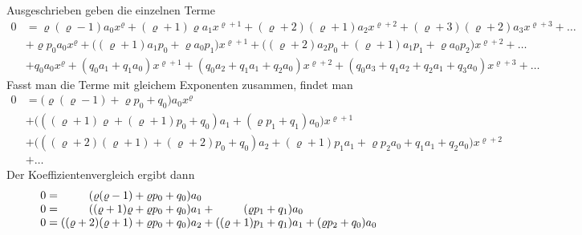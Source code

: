 Ausgeschrieben geben die einzelnen Terme
\begin{align*}
0
&=
\varrho(\varrho-1)a_0x^\varrho
+
(\varrho+1)\varrho a_1x^{\varrho+1}
+
(\varrho+2)(\varrho+1)a_2x^{\varrho+2}
+
(\varrho+3)(\varrho+2)a_3x^{\varrho+3}
+
\dots
\\
&+
\varrho p_0 a_0 x^{\varrho}
+
\bigl((\varrho +1)a_1p_0 + \varrho a_0 p_1\bigr) x^{\varrho+1}
+
\bigl((\varrho +2)a_2p_0 + (\varrho+1)a_1p_1 + \varrho a_0 p_2\bigr) x^{\varrho+2}
+
\dots
\label{buch:differentialgleichungen:eqn:dglverallg}
\\
&+
q_0a_0x^{\varrho}
+
(q_0a_1+q_1a_0) x^{\varrho+1}
+
(q_0a_2+q_1a_1+q_2a_0) x^{\varrho+2}
+
(q_0a_3+q_1a_2+q_2a_1+q_3a_0) x^{\varrho+3}
+
\dots
\end{align*}
Fasst man die Terme mit gleichem Exponenten zusammen, findet man
\begin{align*}
0
&=
\bigl(
\varrho(\varrho-1) + \varrho p_0 + q_0
\bigr)a_0 x^{\varrho}
\\
&+
\bigl(
((\varrho+1)\varrho 
+
(\varrho+1) p_0
+
q_0) a_1
+
( \varrho p_1 + q_1)a_0
\bigr)x^{\varrho+1}
\\
&+
\bigl(
(
(\varrho+2)(\varrho+1)
+
(\varrho+2)p_0
+
q_0)a_2
+
(\varrho+1)p_1 a_1
+
\varrho p_2 a_0
+q_1a_1+q_2a_0
\bigr)x^{\varrho+2}
\\
&+\dots
\end{align*}
Der Koeffizientenvergleich ergibt dann
\[
\renewcommand{\arraycolsep}{0pt}
\begin{array}{rcrlcrlcrl}
0&\mathstrut=\mathstrut&(\varrho(\varrho-1)     + \varrho p_0 + q_0)&a_0
	& &                 &
		&&
\\
0&\mathstrut=\mathstrut&((\varrho+1)\varrho     + \varrho p_0 + q_0)&a_1
	&\mathstrut+\mathstrut&(\varrho p_1+q_1)&a_0
		& &
\\
0&\mathstrut=\mathstrut&((\varrho+2)(\varrho+1) + \varrho p_0 + q_0)&a_2
	&\mathstrut+\mathstrut&((\varrho+1)p_1+q_1)&a_1
		&\mathstrut+\mathstrut&(\varrho p_2+q_0)&a_0
\end{array}
\]

